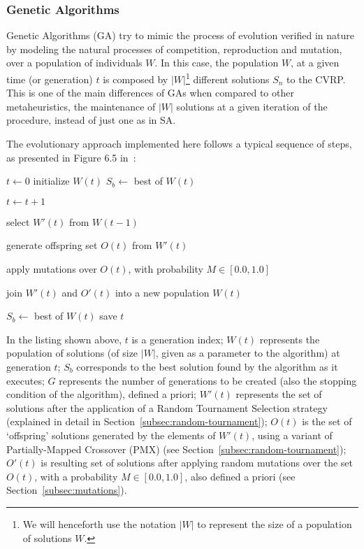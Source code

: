 \subsubsection{Genetic Algorithms}
\label{subsubsec:gen-al}

Genetic Algorithms (GA) try to mimic the process of evolution verified in nature 
by modeling the natural processes of competition, reproduction and mutation, over 
a population of individuals $W$. In this case, the population $W$, at a given 
time (or generation) $t$ is composed by $|W|$\footnote{We will henceforth use the notation $|W|$ to represent the size of a population of solutions $W$.} different solutions $S_n$ to the 
CVRP. This is one of the main differences of GAs when compared to other 
metaheuristics, the maintenance of $|W|$ solutions at a given iteration of the 
procedure, instead of just one as in SA.\vertbreak

The evolutionary approach implemented here follows a typical sequence of steps, 
as presented in Figure 6.5 in~\cite{Michalewicz2004}:\vertbreak

\begin{algorithmic}[1]

\State $t \leftarrow 0$
\State initialize $W(t)$
\State $S_b \leftarrow$ best of $W(t)$


\State $t \leftarrow t + 1$

\State select $W'(t)$ from $W(t - 1)$

\State generate offspring set $O(t)$ from $W'(t)$

\State apply mutations over $O(t)$, 
\Statex[2] with probability $M \in [0.0, 1.0]$

\State join $W'(t)$ and $O'(t)$ into a new population $W(t)$


    \State $S_b \leftarrow$ best of $W(t)$
    \State save $t$

\EndIf

\EndWhile

\end{algorithmic}\vertbreak

In the listing shown above, $t$ is a generation index; $W(t)$ represents the 
population of solutions (of size $|W|$, given as a parameter to the algorithm) at 
generation $t$; $S_b$ corresponds to the 
best solution found by the algorithm as it executes; $G$ represents the number of generations 
to be created (also the stopping condition of the algorithm), defined a priori; 
$W'(t)$ represents the set of solutions after the application of a Random 
Tournament Selection strategy (explained in detail in Section~\ref{subsec:random-tournament}); $O(t)$ 
is the set of `offspring' solutions generated by the elements of $W'(t)$, using 
a variant of Partially-Mapped Crossover (PMX) (see Section~\ref{subsec:random-tournament}); $O'(t)$ is 
resulting set of solutions after applying random mutations over the set $O(t)$, 
with a probability $M \in [0.0, 1.0]$, also defined a priori (see Section~\ref{subsec:mutations}).


